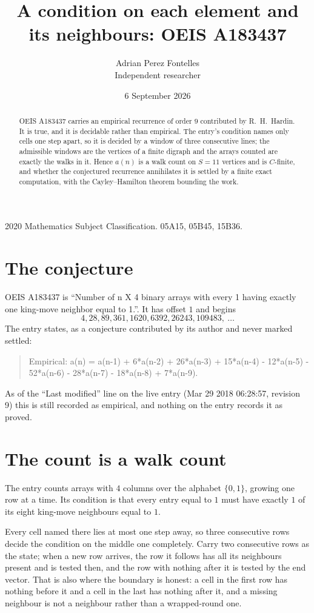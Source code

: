 \documentclass[11pt,a4paper]{article}
\title{A condition on each element and its neighbours: OEIS A183437}
\author{Adrian Perez Fontelles\\ \small Independent researcher}
\date{6 September 2026}
\theoremstyle{plain}
\theoremstyle{definition}
\begin{document}
\maketitle

\begin{abstract}
OEIS A183437 carries an empirical recurrence of order $9$ contributed by R.~H.~Hardin. It is
true, and it is decidable rather than empirical. The entry's condition names only cells one step apart, so it is decided by a window of
three consecutive lines; the
admissible windows are the vertices of a finite digraph and the arrays counted are exactly the
walks in it. Hence $a(n)$ is a walk count on $S=11$ vertices and is $C$-finite, and whether the
conjectured recurrence annihilates it is settled by a finite exact computation, with the
Cayley--Hamilton theorem bounding the work.
\end{abstract}

\noindent\small 2020 Mathematics Subject Classification. 05A15, 05B45, 15B36.\normalsize

\section{The conjecture}

OEIS A183437 is ``Number of n X 4 binary arrays with every 1 having exactly one king-move neighbor equal to 1.''. It has offset $1$ and begins
\[
4, 28, 89, 361, 1620, 6392, 26243, 109483,\ \dots
\]
The entry states, as a conjecture contributed by its author and never marked settled:
\begin{quote}
Empirical: a(n) = a(n-1) + 6*a(n-2) + 26*a(n-3) + 15*a(n-4) - 12*a(n-5) - 52*a(n-6) - 28*a(n-7) - 18*a(n-8) + 7*a(n-9).
\end{quote}
As of the ``Last modified'' line on the live entry (Mar 29 2018 06:28:57, revision 9) this is still
recorded as empirical, and nothing on the entry records it as proved.

\section{The count is a walk count}

The entry counts arrays with $4$ columns over the alphabet $\{0,1\}$, growing one row at a time. Its condition is that every entry equal to $1$ must have exactly $1$ of its eight king-move neighbours equal to $1$.

Every cell named there lies at most one step away, so three consecutive rows decide the condition on the middle one completely. Carry two consecutive rows as the state; when a new row arrives, the row it follows has all its neighbours present and is tested then, and the row with nothing after it is tested by the end vector. That is also where the boundary is honest: a cell in the first row has nothing before it and a cell in the last has nothing after it, and a missing neighbour is not a neighbour rather than a wrapped-round one.
\end{document}

